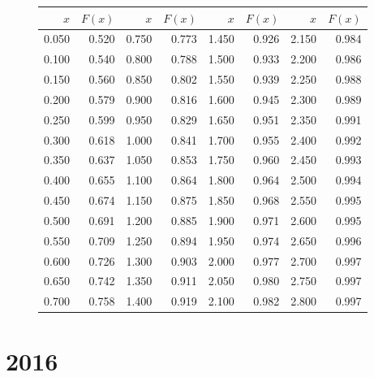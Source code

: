 \documentclass[addpoints, answers]{exam} %
\begin{document}
\begin{figure}[b]
\begin{minipage}[b]{0.35\linewidth}
\begin{tikzpicture}
\end{tikzpicture}
\par\vspace{0pt}
  \end{minipage}%
  \begin{minipage}[b]{0.60\linewidth}
    \centering
\begin{tabular}{rr|rr|rr|rr}
  \hline
$x$ & $F(x)$ & $x$ & $F(x)$ & $x$ & $F(x)$ & $x$ & $F(x)$ \\
  \hline
0.050 & 0.520 & 0.750 & 0.773 & 1.450 & 0.926 & 2.150 & 0.984 \\
  0.100 & 0.540 & 0.800 & 0.788 & 1.500 & 0.933 & 2.200 & 0.986 \\
  0.150 & 0.560 & 0.850 & 0.802 & 1.550 & 0.939 & 2.250 & 0.988 \\
  0.200 & 0.579 & 0.900 & 0.816 & 1.600 & 0.945 & 2.300 & 0.989 \\
  0.250 & 0.599 & 0.950 & 0.829 & 1.650 & 0.951 & 2.350 & 0.991 \\
  0.300 & 0.618 & 1.000 & 0.841 & 1.700 & 0.955 & 2.400 & 0.992 \\
  0.350 & 0.637 & 1.050 & 0.853 & 1.750 & 0.960 & 2.450 & 0.993 \\
  0.400 & 0.655 & 1.100 & 0.864 & 1.800 & 0.964 & 2.500 & 0.994 \\
  0.450 & 0.674 & 1.150 & 0.875 & 1.850 & 0.968 & 2.550 & 0.995 \\
  0.500 & 0.691 & 1.200 & 0.885 & 1.900 & 0.971 & 2.600 & 0.995 \\
  0.550 & 0.709 & 1.250 & 0.894 & 1.950 & 0.974 & 2.650 & 0.996 \\
  0.600 & 0.726 & 1.300 & 0.903 & 2.000 & 0.977 & 2.700 & 0.997 \\
  0.650 & 0.742 & 1.350 & 0.911 & 2.050 & 0.980 & 2.750 & 0.997 \\
  0.700 & 0.758 & 1.400 & 0.919 & 2.100 & 0.982 & 2.800 & 0.997 \\
   \hline
\end{tabular}
\par\vspace{0pt}
\end{minipage}
\label{fig:test}
\end{figure}

\newpage
\section{2016}
\end{document}
